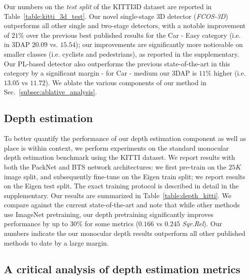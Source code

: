 
Our numbers on the \textit{test split} of the KITTI3D dataset are reported in Table~\ref{table:kitti_3d_test}. Our novel single-stage 3D detector (\textit{FCOS-3D}) outperforms all other single and two-stage detectors, with a notable improvement of $21\%$ over the previous best published results for the Car - Easy category (i.e. in 3DAP $20.09$ vs. $15.54$); our improvements are significantly more noticeable on smaller classes (i.e. cyclists and pedestrians), as reported in the supplementary. Our PL-based detector also outperforms the previous state-of-the-art in this category by a significant margin - for Car - medium our 3DAP is $11\%$ higher (i.e. $13.05$ vs $11.72$). We ablate the various components of our method in Sec.~\ref{subsec:ablative_analysis}.






\subsection{Depth estimation}
\label{subsec:depth_estimation}



 To better quantify the performance of our depth estimation component as well as place is within context, we perform experiments on the standard monocular depth estimation benchmark using the KITTI dataset. We report results with both the PackNet and BTS network architectures: we first pre-train on the $25K$ image split, and subsequently fine-tune on the Eigen train split; we report results on the Eigen test split. The exact training protocol is described in detail in the supplementary. Our results are summarized in Table~\ref{table:depth_kitti}. We compare against the current state-of-the-art and note that while other methods use ImageNet pretraining, our depth pretraining significantly improves performance by up to $30\%$ for some metrics ($0.166$ vs $0.245$ \textit{Sqr.Rel}). Our numbers indicate the our monocular depth results outperform all other published methods to date by a large margin. 

\subsection{A critical analysis of depth estimation metrics}
\label{subsec:depth_metrics}

